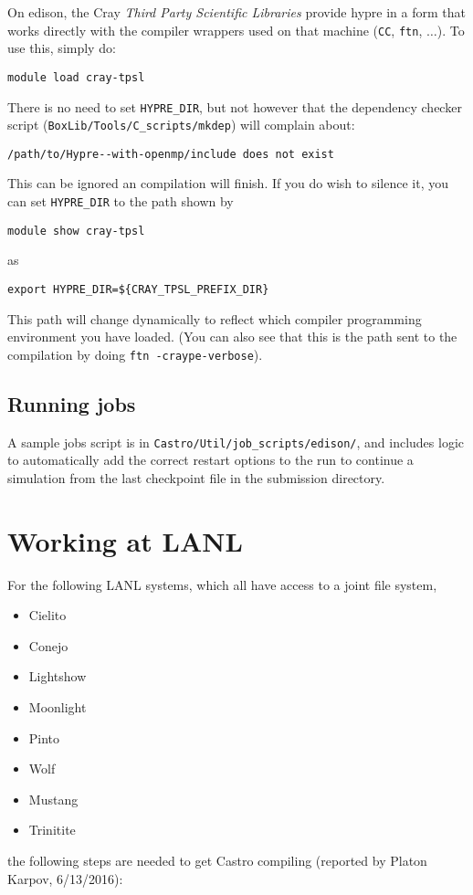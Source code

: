 On edison, the Cray {\em Third Party Scientific Libraries} provide
{\sf hypre} in a form that works directly with the compiler wrappers
used on that machine ({\tt CC}, {\tt ftn}, $\ldots$).  To use this,
simply do:
\begin{verbatim}
module load cray-tpsl
\end{verbatim}
There is no need to set {\tt HYPRE\_DIR}, but not however that the 
dependency checker script ({\tt BoxLib/Tools/C\_scripts/mkdep}) will
complain about:
\begin{verbatim}
/path/to/Hypre--with-openmp/include does not exist
\end{verbatim}
This can be ignored an compilation will finish.  If you do wish to 
silence it, you can set {\tt HYPRE\_DIR} to the path shown by
\begin{verbatim}
module show cray-tpsl
\end{verbatim}
as
\begin{verbatim}
export HYPRE_DIR=${CRAY_TPSL_PREFIX_DIR}
\end{verbatim}
This path will change dynamically to reflect which compiler programming
environment you have loaded.  (You can also see that this is the path
sent to the compilation by doing {\tt ftn -craype-verbose}).


\subsection{Running jobs}

A sample jobs script is in {\tt Castro/Util/job\_scripts/edison/}, and 
includes logic to automatically add the correct restart options to the 
run to continue a simulation from the last checkpoint file in the 
submission directory.


\section{Working at LANL}

For the following LANL systems, which all have access to a joint file system,
\begin{itemize}
  \item Cielito
  \item Conejo
  \item Lightshow
  \item Moonlight
  \item Pinto
  \item Wolf
  \item Mustang
  \item Trinitite
\end{itemize}
the following steps are needed to get Castro compiling (reported by Platon Karpov, 6/13/2016):

